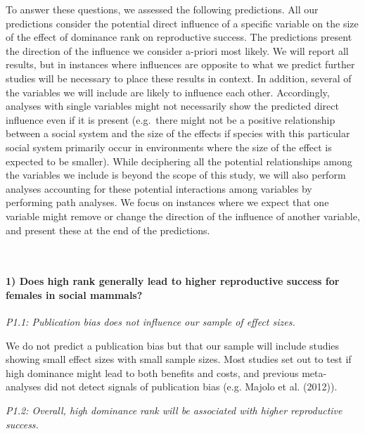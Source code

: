 \documentclass[
]{article}
\begin{document}
To answer these questions, we assessed the following predictions. All
our predictions consider the potential direct influence of a specific
variable on the size of the effect of dominance rank on reproductive
success. The predictions present the direction of the influence we
consider a-priori most likely. We will report all results, but in
instances where influences are opposite to what we predict further
studies will be necessary to place these results in context. In
addition, several of the variables we will include are likely to
influence each other. Accordingly, analyses with single variables might
not necessarily show the predicted direct influence even if it is
present (e.g.~there might not be a positive relationship between a
social system and the size of the effects if species with this
particular social system primarily occur in environments where the size
of the effect is expected to be smaller). While deciphering all the
potential relationships among the variables we include is beyond the
scope of this study, we will also perform analyses accounting for these
potential interactions among variables by performing path analyses. We
focus on instances where we expect that one variable might remove or
change the direction of the influence of another variable, and present
these at the end of the predictions.

~

\hypertarget{does-high-rank-generally-lead-to-higher-reproductive-success-for-females-in-social-mammals-1}{%
\paragraph{\texorpdfstring{\textbf{1) Does high rank generally lead to
higher reproductive success for females in social
mammals?}}{1) Does high rank generally lead to higher reproductive success for females in social mammals?}}\label{does-high-rank-generally-lead-to-higher-reproductive-success-for-females-in-social-mammals-1}}

\emph{P1.1: Publication bias does not influence our sample of effect
sizes.}

We do not predict a publication bias but that our sample will include
studies showing small effect sizes with small sample sizes. Most studies
set out to test if high dominance might lead to both benefits and costs,
and previous meta-analyses did not detect signals of publication bias
(e.g. Majolo et al. (2012)).

\emph{P1.2: Overall, high dominance rank will be associated with higher
reproductive success.}
\end{document}
